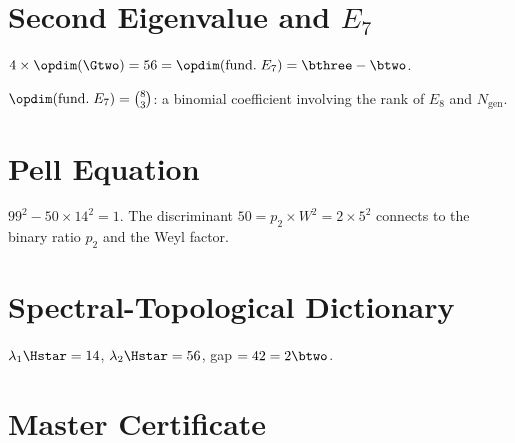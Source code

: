 \section{Second Eigenvalue and $E_7$}

\begin{theorem}[$\lambda_2 \times \Hstar = \opdim(\mathrm{fund.}\; E_7)$]\label{thm:second_ev_E7}
    \leanok
    $4 \times \opdim(\Gtwo) = 56 = \opdim(\mathrm{fund.}\; E_7) = \bthree - \btwo$.
\end{theorem}

\begin{theorem}[$56 = C(\mathrm{rank}(E_8), N_{\mathrm{gen}})$]\label{thm:second_ev_binom}
    \leanok
    $\opdim(\mathrm{fund.}\; E_7) = \binom{8}{3}$: a binomial coefficient
    involving the rank of $E_8$ and $N_{\mathrm{gen}}$.
\end{theorem}

\section{Pell Equation}

\begin{theorem}\label{thm:pell_eq}
    \leanok
    $99^2 - 50 \times 14^2 = 1$. The discriminant $50 = p_2 \times W^2 = 2 \times 5^2$
    connects to the binary ratio $p_2$ and the Weyl factor.
\end{theorem}

\section{Spectral-Topological Dictionary}

\begin{theorem}\label{thm:spectral_ladder}
    \leanok
    $\lambda_1 \Hstar = 14$, $\lambda_2 \Hstar = 56$,
    gap $= 42 = 2\btwo$.
\end{theorem}

\section{Master Certificate}

